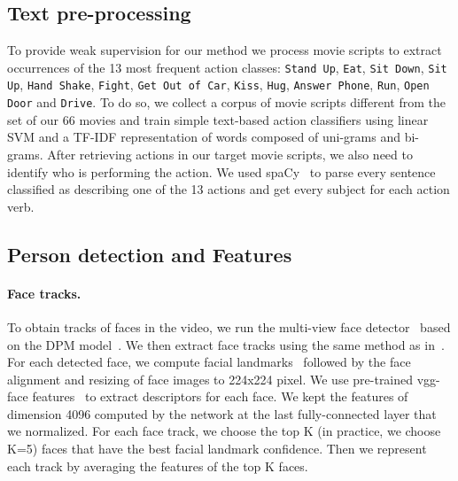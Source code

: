 \documentclass[10pt,twocolumn,letterpaper]{article}
\begin{document}
\subsection{Text pre-processing} \label{nlp}
To provide weak supervision for our method we process movie scripts to extract occurrences of the 13 most frequent action classes:
\texttt{Stand Up}, \texttt{Eat}, \texttt{Sit Down}, \texttt{Sit Up}, \texttt{Hand Shake}, \texttt{Fight}, \texttt{Get Out of Car}, \texttt{Kiss}, \texttt{Hug}, \texttt{Answer Phone}, \texttt{Run}, \texttt{Open Door} and \texttt{Drive}. To do so, we collect a corpus of movie scripts different from the set of our 66 movies and train simple text-based action classifiers using linear SVM and a TF-IDF representation of words composed of uni-grams and bi-grams. 
After retrieving actions in our target movie scripts, we also need to identify who is performing the action. We used spaCy~\cite{honnibalspacy} to parse every sentence classified as describing one of the 13 actions
and get every subject for each action verb. 




\subsection{Person detection and Features}
\paragraph{Face tracks.}  To obtain tracks of faces in the video, we run the multi-view face detector~\cite{mathiasdpm} based on the DPM model~\cite{dpm}.
We then extract face tracks using the same method as in~\cite{everingham06hello,sivic09who}. 
 For each detected face, we compute facial landmarks~\cite{sivic09who} followed by the face alignment and resizing of face images to 224x224 pixel. We use pre-trained vgg-face features~\cite{parkhideepface} to 
extract descriptors for each face. We kept the features of dimension 4096 computed by the network at the last fully-connected
layer that we  normalized. For each face track, we choose the top K (in practice, we choose K=5) faces that have the best facial landmark confidence. Then we represent each track by averaging the features of the top K faces.
\end{document}
